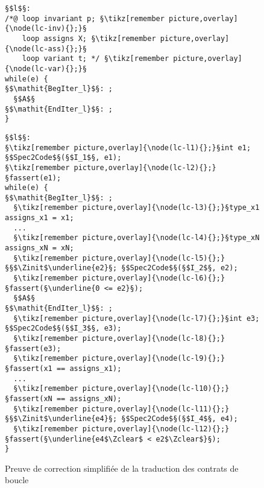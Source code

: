 \begin{figure}[bt]
  \begin{minipage}{0.65\textwidth}
    \begin{lstlisting}[escapechar=§]
§$l$§:
/*@ loop invariant p; §\tikz[remember picture,overlay]{\node(lc-inv){};}§
    loop assigns X; §\tikz[remember picture,overlay]{\node(lc-ass){};}§
    loop variant t; */ §\tikz[remember picture,overlay]{\node(lc-var){};}§
while(e) {
§$\mathit{BegIter_l}$§: ;
  §$A$§
§$\mathit{EndIter_l}$§: ;
}
    \end{lstlisting}
  \end{minipage}\hfill
  \begin{minipage}{0.49\textwidth}
    \begin{lstlisting}[escapechar=§]
§$l$§:
§\tikz[remember picture,overlay]{\node(lc-l1){};}§int e1; §$Spec2Code$§(§$I_1$§, e1);
§\tikz[remember picture,overlay]{\node(lc-l2){};}§fassert(e1);
while(e) {
§$\mathit{BegIter_l}$§: ;
  §\tikz[remember picture,overlay]{\node(lc-l3){};}§type_x1 assigns_x1 = x1;
  ...
  §\tikz[remember picture,overlay]{\node(lc-l4){};}§type_xN assigns_xN = xN;
  §\tikz[remember picture,overlay]{\node(lc-l5){};}§§$\Zinit$\underline{e2}§; §$Spec2Code$§(§$I_2$§, e2);
  §\tikz[remember picture,overlay]{\node(lc-l6){};}§fassert(§\underline{0 <= e2}§);
  §$A$§
§$\mathit{EndIter_l}$§: ;
  §\tikz[remember picture,overlay]{\node(lc-l7){};}§int e3; §$Spec2Code$§(§$I_3$§, e3);
  §\tikz[remember picture,overlay]{\node(lc-l8){};}§fassert(e3);
  §\tikz[remember picture,overlay]{\node(lc-l9){};}§fassert(x1 == assigns_x1);
  ...
  §\tikz[remember picture,overlay]{\node(lc-l10){};}§fassert(xN == assigns_xN);
  §\tikz[remember picture,overlay]{\node(lc-l11){};}§§$\Zinit$\underline{e4}§; §$Spec2Code$§(§$I_4$§, e4);
  §\tikz[remember picture,overlay]{\node(lc-l12){};}§fassert(§\underline{e4$\Zclear$ < e2$\Zclear$}§);
}
    \end{lstlisting}
  \end{minipage}
  \caption{Preuve de correction simplifiée de la traduction des contrats de
    boucle}
  \label{fig:proof-loop-contract}
\end{figure}
